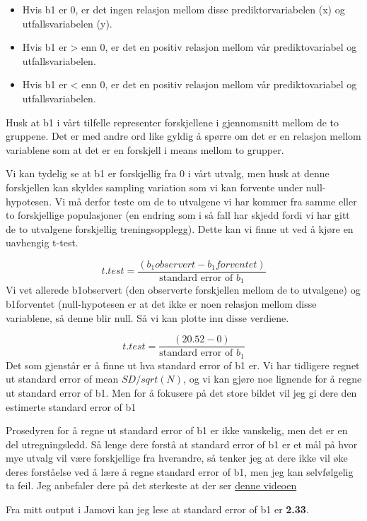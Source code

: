 \documentclass[
]{book}
\providecommand{\tightlist}{%
  \setlength{\itemsep}{0pt}\setlength{\parskip}{0pt}}
\begin{document}
\begin{itemize}
\tightlist
\item
  Hvis b1 er 0, er det ingen relasjon mellom disse prediktorvariabelen (x) og utfallsvariabelen (y).
\item
  Hvis b1 er \textgreater{} enn 0, er det en positiv relasjon mellom vår prediktovariabel og utfallsvariabelen.
\item
  Hvis b1 er \textless{} enn 0, er det en positiv relasjon mellom vår prediktovariabel og utfallsvariabelen.
\end{itemize}

Husk at b1 i vårt tilfelle representer forskjellene i gjennomsnitt mellom de to gruppene. Det er med andre ord like gyldig å spørre om det er en relasjon mellom variablene som at det er en forskjell i means mellom to grupper.

Vi kan tydelig se at b1 er forskjellig fra 0 i vårt utvalg, men husk at denne forskjellen kan skyldes sampling variation som vi kan forvente under null-hypotesen. Vi må derfor teste om de to utvalgene vi har kommer fra samme eller to forskjellige populasjoner (en endring som i så fall har skjedd fordi vi har gitt de to utvalgene forskjellig treningsopplegg). Dette kan vi finne ut ved å kjøre en uavhengig t-test.

\[
t.test = \frac{(b_1observert - b_1forventet)}{\text{standard error of } b_1}
\]
Vi vet allerede b1observert (den observerte forskjellen mellom de to utvalgene) og b1forventet (null-hypotesen er at det ikke er noen relasjon mellom disse variablene, så denne blir null. Så vi kan plotte inn disse verdiene.

\[
t.test = \frac{(20.52 - 0)}{\text{standard error of } b_1}
\]
Det som gjenstår er å finne ut hva standard error of b1 er. Vi har tidligere regnet ut standard error of mean \(SD/sqrt(N)\), og vi kan gjøre noe lignende for å regne ut standard error of b1. Men for å fokusere på det store bildet vil jeg gi dere den estimerte standard error of b1

Prosedyren for å regne ut standard error of b1 er ikke vanskelig, men det er en del utregningsledd. Så lenge dere forstå at standard error of b1 er et mål på hvor mye utvalg vil være forskjellige fra hverandre, så tenker jeg at dere ikke vil øke deres forståelse ved å lære å regne standard error of b1, men jeg kan selvfølgelig ta feil. Jeg anbefaler dere på det sterkeste at der ser \href{https://www.youtube.com/watch?v=3L9ZMdzJyyI}{denne videoen}

Fra mitt output i Jamovi kan jeg lese at standard error of b1 er \textbf{2.33}.
\end{document}
